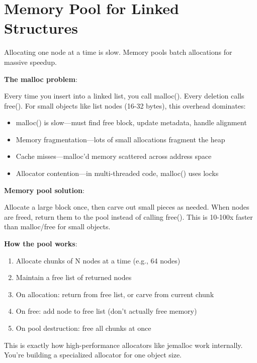 \section{Memory Pool for Linked Structures}

Allocating one node at a time is slow. Memory pools batch allocations for massive speedup.

\textbf{The malloc problem}:

Every time you insert into a linked list, you call malloc(). Every deletion calls free(). For small objects like list nodes (16-32 bytes), this overhead dominates:
\begin{itemize}
    \item malloc() is slow---must find free block, update metadata, handle alignment
    \item Memory fragmentation---lots of small allocations fragment the heap
    \item Cache misses---malloc'd memory scattered across address space
    \item Allocator contention---in multi-threaded code, malloc() uses locks
\end{itemize}

\textbf{Memory pool solution}:

Allocate a large block once, then carve out small pieces as needed. When nodes are freed, return them to the pool instead of calling free(). This is 10-100x faster than malloc/free for small objects.

\textbf{How the pool works}:
\begin{enumerate}
    \item Allocate chunks of N nodes at a time (e.g., 64 nodes)
    \item Maintain a free list of returned nodes
    \item On allocation: return from free list, or carve from current chunk
    \item On free: add node to free list (don't actually free memory)
    \item On pool destruction: free all chunks at once
\end{enumerate}

This is exactly how high-performance allocators like jemalloc work internally. You're building a specialized allocator for one object size.

